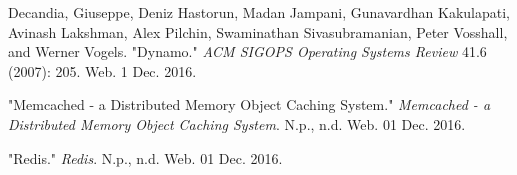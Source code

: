\documentclass[11pt,twoside]{article}
\begin{document}
\begin{thebibliography}{3}

Decandia, Giuseppe, Deniz Hastorun, Madan Jampani, Gunavardhan Kakulapati, Avinash Lakshman, Alex Pilchin, Swaminathan Sivasubramanian, Peter Vosshall, and Werner Vogels. "Dynamo." \textit{ACM SIGOPS Operating Systems Review} 41.6 (2007): 205. Web. 1 Dec. 2016.

"Memcached - a Distributed Memory Object Caching System." \textit{Memcached - a Distributed Memory Object Caching System}. N.p., n.d. Web. 01 Dec. 2016.

"Redis." \textit{Redis}. N.p., n.d. Web. 01 Dec. 2016.

\end{thebibliography}
\end{document}
